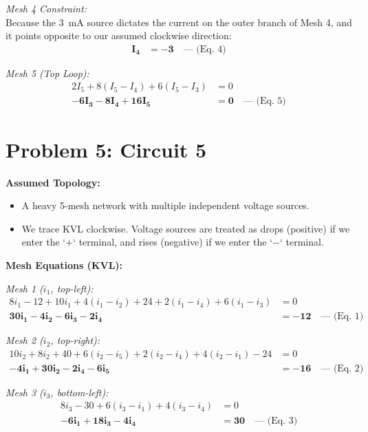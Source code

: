 \documentclass[11pt]{article}
\begin{document}
\textit{Mesh 4 Constraint:} \\
Because the \SI{3}{\milli\ampere} source dictates the current on the outer branch of Mesh 4, and it points opposite to our assumed clockwise direction:
\begin{align*}
  \mathbf{I_4} &\mathbf{= -3} \quad \text{--- (Eq. 4)}
\end{align*}

\textit{Mesh 5 (Top Loop):}
\begin{align*}
  2I_5 + 8(I_5 - I_4) + 6(I_5 - I_3) &= 0 \\
  \mathbf{-6I_3 - 8I_4 + 16I_5} &\mathbf{= 0} \quad \text{--- (Eq. 5)}
\end{align*}

\section*{Problem 5: Circuit 5}

\textbf{Assumed Topology:}
\begin{itemize}
  \item A heavy 5-mesh network with multiple independent voltage sources.
  \item We trace KVL clockwise. Voltage sources are treated as drops (positive) if we enter the `$+$` terminal, and rises (negative) if we enter the `$-$` terminal.
\end{itemize}

\textbf{Mesh Equations (KVL):}

\textit{Mesh 1 ($i_1$, top-left):}
\begin{align*}
  8i_1 - 12 + 10i_1 + 4(i_1 - i_2) + 24 + 2(i_1 - i_4) + 6(i_1 - i_3) &= 0 \\
  \mathbf{30i_1 - 4i_2 - 6i_3 - 2i_4} &\mathbf{= -12} \quad \text{--- (Eq. 1)}
\end{align*}

\textit{Mesh 2 ($i_2$, top-right):}
\begin{align*}
  10i_2 + 8i_2 + 40 + 6(i_2 - i_5) + 2(i_2 - i_4) + 4(i_2 - i_1) - 24 &= 0 \\
  \mathbf{-4i_1 + 30i_2 - 2i_4 - 6i_5} &\mathbf{= -16} \quad \text{--- (Eq. 2)}
\end{align*}

\textit{Mesh 3 ($i_3$, bottom-left):}
\begin{align*}
  8i_3 - 30 + 6(i_3 - i_1) + 4(i_3 - i_4) &= 0 \\
  \mathbf{-6i_1 + 18i_3 - 4i_4} &\mathbf{= 30} \quad \text{--- (Eq. 3)}
\end{align*}
\end{document}
